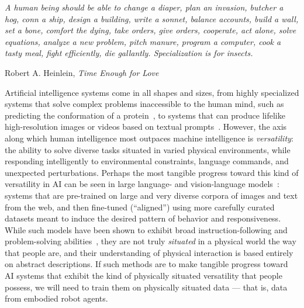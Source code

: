 \epigraph{\textit{A human being should be able to change a diaper, plan an invasion, butcher a hog, conn a ship, design a building, write a sonnet, balance accounts, build a wall, set a bone, comfort the dying, take orders, give orders, cooperate, act alone, solve equations, analyze a new problem, pitch manure, program a computer, cook a tasty meal, fight efficiently, die gallantly. Specialization is for insects.}}{Robert A. Heinlein, \textit{Time Enough for Love}}

Artificial intelligence systems come in all shapes and sizes, from highly specialized systems that solve complex problems inaccessible to the human mind, such as predicting the conformation of a protein~\citep{jumper2021highly}, to systems that can produce lifelike high-resolution images or videos based on textual prompts~\citep{rombach2022high}. However, the axis along which human intelligence most outpaces machine intelligence is \emph{versatility}: the ability to solve diverse tasks situated in varied physical environments, while responding intelligently to environmental constraints, language commands, and unexpected perturbations. Perhaps the most tangible progress toward this kind of versatility in AI can be seen in large language- and vision-language models~\citep{achiam2023gpt, team2023gemini}: systems that are pre-trained on large and very diverse corpora of images and text from the web, and then fine-tuned (``aligned'') using more carefully curated datasets meant to induce the desired pattern of behavior and responsiveness. While such models have been shown to exhibit broad instruction-following and problem-solving abilities~\citep{wei2021finetuned, li2022alphacode}, they are not truly \emph{situated} in a physical world the way that people are, and their understanding of physical interaction is based entirely on abstract descriptions. If such methods are to make tangible progress toward AI systems that exhibit the kind of physically situated versatility that people possess, we will need to train them on physically situated data --- that is, data from embodied robot agents.

